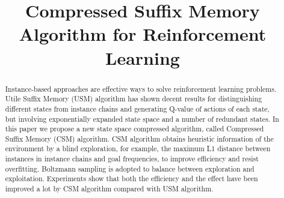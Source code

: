 \documentclass[conference]{IEEEtran}
\begin{document}
	
	\title{Compressed Suffix Memory Algorithm for Reinforcement Learning\\
	}
	\author{
		\and
		\and
		\and
	}
	
	\maketitle
	
	\begin{abstract}
		Instance-based approaches are effective ways to solve reinforcement learning problems.
		Utile Suffix Memory (USM) algorithm has shown decent results for distinguishing different
		states from instance chains and generating Q-value of actions of each state, but involving
		exponentially expanded state space and a number of redundant states. In this paper we
		propose a new state space compressed algorithm, called Compressed Suffix Memory (CSM)
		algorithm. CSM algorithm obtains heuristic information of the environment by a blind
		exploration, for example, the maximum L1 distance between instances in instance chains
		and goal frequencies, to improve efficiency and resist overfitting. Boltzmann sampling
		is adopted to balance between exploration and exploitation. Experiments show that both
		the efficiency and the effect have been improved a lot by CSM algorithm compared with
		USM algorithm.
	\end{abstract}
	
\end{document}
